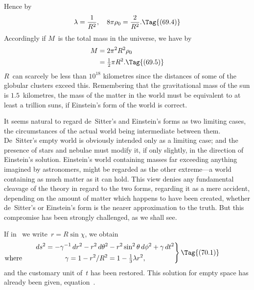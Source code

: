 \documentclass[12pt]{book}
\begin{document}
Hence by~
\[
\lambda = \frac{1}{R^{2}},\quad
8\pi\rho_{0} = \frac{2}{R^{2}}.
\Tag{(69.4)}
\]
Accordingly if $M$~is the total mass in the universe, we have by~
\begin{align*}
  M &= 2\pi^{2} R^{2} \rho_{0} \\
  &= \tfrac{1}{2}\pi R^{2}.
  \Tag{(69.5)}
\end{align*}
$R$~can scarcely be less than $10^{18}$ kilometres since the distances of some of the
globular clusters exceed this. Remembering that the gravitational mass of
the sun is $1.5$~kilometres, the mass of the matter in the world must be equivalent
to at least a trillion suns, if Einstein's form of the world is correct.

It seems natural to regard de~Sitter's and Einstein's forms as two limiting
cases, the circumstances of the actual world being intermediate between them.
De~Sitter's empty world is obviously intended only as a limiting case; and
the presence of stars and nebulae must modify it, if only slightly, in the
direction of Einstein's solution. Einstein's world containing masses far exceeding
anything imagined by astronomers, might be regarded as the other
extreme---a world containing as much matter as it can hold. This view denies
any fundamental cleavage of the theory in regard to the two forms, regarding
it as a mere accident, depending on the amount of matter which happens to
have been created, whether de~Sitter's or Einstein's form is the nearer approximation
to the truth. But this compromise has been strongly challenged,
as we shall see.

%
%
%
%
%
%

If in~ we write~$r = R\sin\chi$, we obtain
\[
\left.
\begin{gathered}
  ds^{2} = -\gamma^{-1}\, dr^{2} - r^{2}\, d\theta^2 - r^{2}\sin^{2}\theta\, d\phi^{2} + \gamma\, dt^{2} \\
\llap{\text{where}\rule{0.87in}{0pt}}
\gamma = 1 - r^{2}/R^{2} = 1 - \tfrac{1}{3}\lambda r^{2},
\end{gathered}\right\}
\Tag{(70.1)}
\]
and the customary unit of~$t$ has been restored. This solution for empty space
has already been given, equation~.
\end{document}
